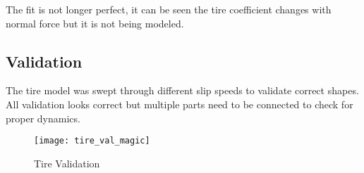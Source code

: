 \documentclass[../SimBALink.tex]{subfiles}
\begin{document}
The fit is not longer perfect, it can be seen the tire coefficient changes with normal force but it is not being modeled.

\subsection{Validation}

The tire model was swept through different slip speeds to validate correct shapes. All validation looks correct but multiple parts need to be connected to check for proper dynamics. 

\begin{figure}[H]
\center
 \texttt{[image: tire\_val\_magic]}
  \caption{Tire Validation}
\end{figure}
\end{document}
